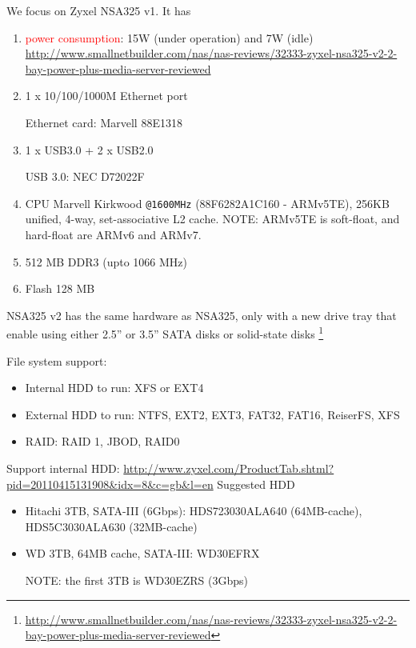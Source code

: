 We focus on Zyxel NSA325 v1. It has
\begin{enumerate}
  \item \textcolor{red}{power consumption}: 15W (under operation) and 7W (idle)
  \url{http://www.smallnetbuilder.com/nas/nas-reviews/32333-zyxel-nsa325-v2-2-bay-power-plus-media-server-reviewed}
  
  \item 1 x 10/100/1000M Ethernet port
  
  Ethernet card: Marvell 88E1318
  
  \item 1 x USB3.0 + 2 x USB2.0

  USB 3.0: NEC D72022F
  
  \item CPU Marvell Kirkwood \verb!@1600MHz! (88F6282A1C160 - ARMv5TE), 256KB
  unified, 4-way, set-associative L2 cache. NOTE: ARMv5TE is soft-float, and
  hard-float are ARMv6 and ARMv7.

  \item 512 MB DDR3 (upto 1066 MHz)
  \item Flash 128 MB  
\end{enumerate}

\begin{mdframed}
NSA325 v2 has the same hardware as NSA325, only with a new drive tray that
enable using either 2.5'' or 3.5'' SATA disks or solid-state disks
\footnote{\url{http://www.smallnetbuilder.com/nas/nas-reviews/32333-zyxel-nsa325-v2-2-bay-power-plus-media-server-reviewed}}
\end{mdframed}


File system support:
\begin{itemize}
  \item Internal HDD to run: XFS or EXT4
  \item External HDD to run: NTFS, EXT2, EXT3, FAT32, FAT16, ReiserFS, XFS
  \item RAID: RAID 1, JBOD, RAID0
\end{itemize}

Support internal HDD:
\url{http://www.zyxel.com/ProductTab.shtml?pid=20110415131908&idx=8&c=gb&l=en}
Suggested HDD
\begin{itemize}
  \item Hitachi 3TB, SATA-III (6Gbps): HDS723030ALA640 (64MB-cache),
  HDS5C3030ALA630 (32MB-cache)
  \item WD 3TB, 64MB cache, SATA-III: WD30EFRX 
  
  NOTE: the first 3TB is WD30EZRS (3Gbps)
\end{itemize}


